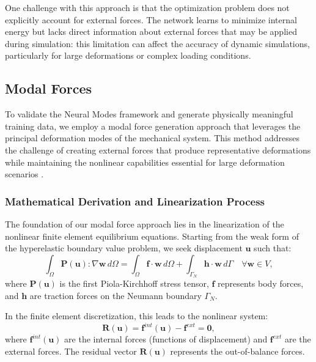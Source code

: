 One challenge with this approach is that the optimization problem does not explicitly account for external forces. The network learns to minimize internal energy but lacks direct information about external forces that may be applied during simulation: this limitation can affect the accuracy of dynamic simulations, particularly for large deformations or complex loading conditions.



\subsection{Modal Forces}
\label{sec:modal_forces}

To validate the Neural Modes framework and generate physically meaningful training data, we employ a modal force generation approach that leverages the principal deformation modes of the mechanical system. This method addresses the challenge of creating external forces that produce representative deformations while maintaining the nonlinear capabilities essential for large deformation scenarios \cite{odotDeepPhysicsPhysicsAware2021}.

\subsubsection{Mathematical Derivation and Linearization Process}

The foundation of our modal force approach lies in the linearization of the nonlinear finite element equilibrium equations. Starting from the weak form of the hyperelastic boundary value problem, we seek displacement $\bm{u}$ such that:
\begin{equation}
    \int_{\Omega} \bm{P}(\bm{u}) : \nabla \bm{w} \, d\Omega = \int_{\Omega} \bm{f} \cdot \bm{w} \, d\Omega + \int_{\Gamma_N} \bm{h} \cdot \bm{w} \, d\Gamma \quad \forall \bm{w} \in V,
\end{equation}
where $\bm{P}(\bm{u})$ is the first Piola-Kirchhoff stress tensor, $\bm{f}$ represents body forces, and $\bm{h}$ are traction forces on the Neumann boundary $\Gamma_N$.

In the finite element discretization, this leads to the nonlinear system:
\begin{equation}
    \bm{R}(\bm{u}) = \bm{f}^{int}(\bm{u}) - \bm{f}^{ext} = \bm{0},
\end{equation}
where $\bm{f}^{int}(\bm{u})$ are the internal forces (functions of displacement) and $\bm{f}^{ext}$ are the external forces. The residual vector $\bm{R}(\bm{u})$ represents the out-of-balance forces.

